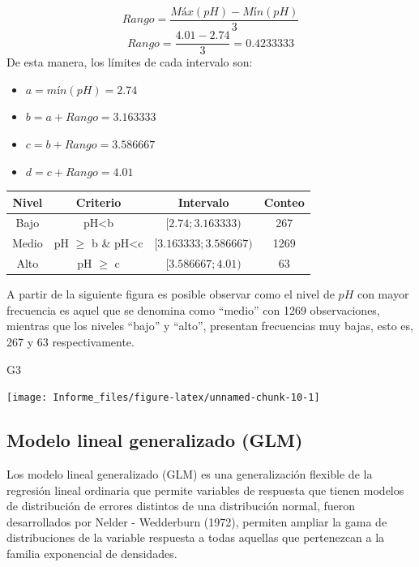\documentclass[
]{article}
\newenvironment{Shaded}{\begin{snugshade}}{\end{snugshade}}
\newcommand{\NormalTok}[1]{#1}
\providecommand{\tightlist}{%
  \setlength{\itemsep}{0pt}\setlength{\parskip}{0pt}}
\begin{document}
\[Rango=\displaystyle\frac{Máx(pH)-Mín(pH)}{3}\]
\[Rango=\displaystyle\frac{4.01-2.74}{3}=0.4233333\] De esta manera, los
límites de cada intervalo son:

\begin{itemize}
\tightlist
\item
  \(a = mín(pH)=2.74\)
\item
  \(b = a + Rango=3.163333\)
\item
  \(c = b + Rango=3.586667\)
\item
  \(d = c + Rango=4.01\)
\end{itemize}

\begin{longtable}[]{@{}cccc@{}}
\toprule
Nivel & Criterio & Intervalo & Conteo\tabularnewline
\midrule
\endhead
Bajo & pH\textless b & \([2.74;3.163333)\) & 267\tabularnewline
Medio & pH \(\geq\) b \& pH\textless c & \([3.163333;3.586667)\) &
1269\tabularnewline
Alto & pH \(\geq\) c & \([3.586667;4.01)\) & 63\tabularnewline
\bottomrule
\end{longtable}

A partir de la siguiente figura es posible observar como el nivel de
\(pH\) con mayor frecuencia es aquel que se denomina como ``medio'' con
1269 observaciones, mientras que los niveles ``bajo'' y ``alto'',
presentan frecuencias muy bajas, esto es, 267 y 63 respectivamente.

\begin{Shaded}
\begin{Highlighting}[]
\NormalTok{G3}
\end{Highlighting}
\end{Shaded}

\begin{center}\texttt{[image: Informe\_files/figure-latex/unnamed-chunk-10-1]} \end{center}

\hypertarget{modelo-lineal-generalizado-glm}{%
\subsection{Modelo lineal generalizado
(GLM)}\label{modelo-lineal-generalizado-glm}}

Los modelo lineal generalizado (GLM) es una generalización flexible de
la regresión lineal ordinaria que permite variables de respuesta que
tienen modelos de distribución de errores distintos de una distribución
normal, fueron desarrollados por Nelder - Wedderburn (1972), permiten
ampliar la gama de distribuciones de la variable respuesta a todas
aquellas que pertenezcan a la familia exponencial de densidades.
\end{document}
